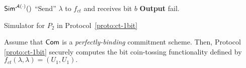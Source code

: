 \begin{algorithm}
${\sf Sim}^{\mathcal{A}(\cdot)}()$\;
``Send'' $\lambda$ to $f_{ct}$ and receives bit $b$\;
{\bf Output} {\sf fail}.

\caption{Simulator for $P_2$ in Protocol~\ref{proto:ct-1bit}}\label{alg:ct-1bit-sim}
\end{algorithm}

\begin{theorem} Assume that ${\sf Com}$ is a {\it perfectly-binding} commitment scheme. Then, Protocol \ref{proto:ct-1bit} securely computes the bit coin-tossing functionality defined by $f_{ct}(\lambda, \lambda)=(U_1,U_1).$
\end{theorem}
